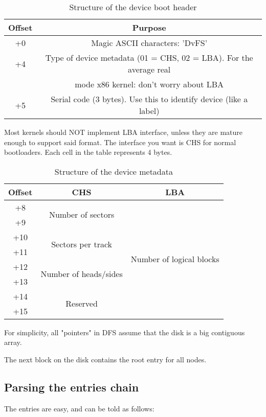 \documentclass[12pt]{article}
\begin{document}
\begin{table}
\centering
\begin{tabular}{ |c|c| }
\hline
Offset & Purpose \\
\hline
+0 & Magic ASCII characters: 'DvFS' \\
+4 & Type of device metadata (01 = CHS, 02 = LBA). For the average real \\
& mode x86 kernel: don't worry about LBA \\
+5 & Serial code (3 bytes). Use this to identify device (like a label) \\
\hline
\end{tabular}
\caption{Structure of the device boot header}
\end{table}

Most kernels should NOT implement LBA interface, unless they are mature enough to support said format. The interface you want is CHS for normal bootloaders. Each cell in the table represents 4 bytes.

\begin{table}
\centering
\begin{tabular}{ |c|c|c| }
\hline
Offset & CHS & LBA \\
\hline
+8 & \multirow{2}{*}{Number of sectors} & \multirow{8}{*}{Number of logical blocks} \\
+9 & & \\
+10 & \multirow{2}{*}{Sectors per track} & \\
+11 & & \\
+12 & \multirow{2}{*}{Number of heads/sides} & \\
+13 & & \\
+14 & \multirow{2}{*}{Reserved} & \\
+15 & & \\
\hline
\end{tabular}
\caption{Structure of the device metadata}
\end{table}

For simplicity, all "pointers" in DFS assume that the disk is a big contiguous array.

The next block on the disk contains the root entry for all nodes.

\subsection{Parsing the entries chain}

The entries are easy, and can be told as follows:
\end{document}
